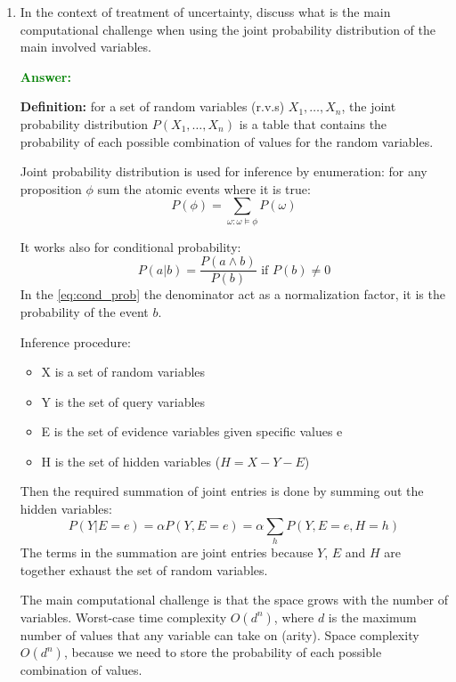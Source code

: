 \documentclass[12pt]{article}
\begin{document}
\begin{enumerate}[label=\textbf{U.\arabic*}]
    \item In the context of treatment of uncertainty, discuss what is the main computational challenge when using the joint probability distribution of the main involved variables.
    
    \textcolor{green}{\textbf{Answer:}}

    \textbf{Definition:} for a set of random variables (r.v.s) $X_1,\ldots,X_n$, the joint probability distribution $P(X_1,\ldots,X_n)$ is a table that contains the probability of each possible combination of values for the random variables.

    Joint probability distribution is used for inference by enumeration: for any proposition $\phi$ sum the atomic events where it is true:
    \begin{equation}
        P(\phi) = \sum_{\omega:\omega\vDash\phi}P(\omega)
    \end{equation} 

    It works also for conditional probability:
    \begin{equation}\label{eq:cond_prob}
        P(a|b) = \frac{P(a\land b)}{P(b)} \text{ if } P(b) \neq 0
    \end{equation}
    In the \ref{eq:cond_prob} the denominator act as a normalization factor, it is the probability of the event $b$.

    Inference procedure: 
    \begin{itemize}
        \item X is a set of random variables 
        \item Y is the set of query variables  
        \item E is the set of evidence variables given specific values e
        \item H is the set of hidden variables ($H = X - Y - E$)
    \end{itemize}
    Then the required summation of joint entries is done by summing out the hidden variables:
    \begin{equation}
        P(Y|E = e) = \alpha P(Y,E = e) = \alpha\sum_{h}P(Y,E = e,H = h)
    \end{equation}
    The terms in the summation are joint entries because $Y$, $E$ and $H$ are together exhaust the set of random variables.

    The main computational challenge is that the space grows with the number of variables.
    Worst-case time complexity $O(d^n)$, where $d$ is the maximum number of values that any variable can take on (arity).
    Space complexity $O(d^n)$, because we need to store the probability of each possible combination of values.



\end{enumerate}
\end{document}
